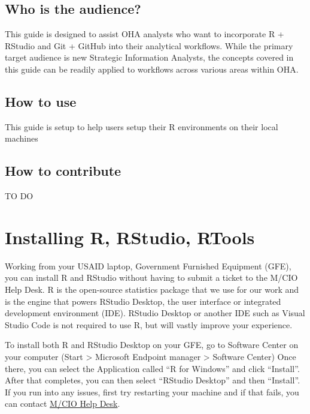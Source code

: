 \documentclass[
  letterpaper,
  DIV=11,
  numbers=noendperiod]{scrreprt}
\begin{document}
\hypertarget{who-is-the-audience}{%
\section{Who is the audience?}\label{who-is-the-audience}}

This guide is designed to assist OHA analysts who want to incorporate R
+ RStudio and Git + GitHub into their analytical workflows. While the
primary target audience is new Strategic Information Analysts, the
concepts covered in this guide can be readily applied to workflows
across various areas within OHA.

\hypertarget{how-to-use}{%
\section{How to use}\label{how-to-use}}

This guide is setup to help users setup their R environments on their
local machines

\hypertarget{how-to-contribute}{%
\section{How to contribute}\label{how-to-contribute}}

TO DO


\hypertarget{installing-r-rstudio-rtools}{%
\chapter{Installing R, RStudio,
RTools}\label{installing-r-rstudio-rtools}}

Working from your USAID laptop, Government Furnished Equipment (GFE),
you can install R and RStudio without having to submit a ticket to the
M/CIO Help Desk. R is the open-source statistics package that we use for
our work and is the engine that powers RStudio Desktop, the user
interface or integrated development environment (IDE). RStudio Desktop
or another IDE such as Visual Studio Code is not required to use R, but
will vastly improve your experience.

To install both R and RStudio Desktop on your GFE, go to Software Center
on your computer (Start \textgreater{} Microsoft Endpoint manager
\textgreater{} Software Center) Once there, you can select the
Application called ``R for Windows'' and click ``Install''. After that
completes, you can then select ``RStudio Desktop'' and then ``Install''.
If you run into any issues, first try restarting your machine and if
that fails, you can contact \href{CIO-HELPDESK@usaid.gov}{M/CIO Help
Desk}.
\end{document}
